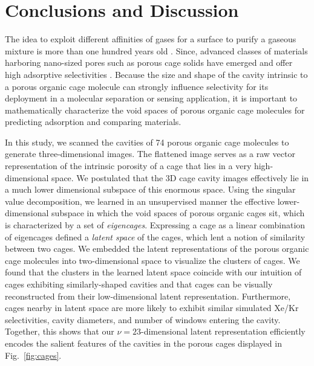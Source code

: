 \documentclass[journal=jacsat,manuscript=article,layout=traditional]{achemso}
\begin{document}
\section{Conclusions and Discussion}
The idea to exploit different affinities of gases for a surface to purify a gaseous mixture is more than one hundred years old \cite{boyle1908theabsorption}. Since, advanced classes of materials harboring nano-sized pores such as porous cage solids \cite{hasell2016porous,holst2010porous} have emerged and offer high adsorptive selectivities \cite{mastalerz2011salicylbisimine,tian2009amorphous,
hong2015porphyrin,chen2014separation,patil2016noria,sf6seps}.
Because the size and shape of the cavity intrinsic to a porous organic cage molecule can strongly influence selectivity for its deployment in a molecular separation or sensing application\cite{mitra2013molecular}, it is important to mathematically characterize the void spaces of porous organic cage molecules for predicting adsorption and comparing materials. 

In this study, we scanned the cavities of 74 porous organic cage molecules to generate three-dimensional images. The flattened image serves as a raw vector representation of the intrinsic porosity of a cage that lies in a very high-dimensional space. We postulated that the 3D cage cavity images effectively lie in a much lower dimensional subspace of this enormous space. Using the singular value decomposition, we learned in an unsupervised manner the effective lower-dimensional subspace in which the void spaces of porous organic cages sit, which is characterized by a set of \emph{eigencages}. Expressing a cage as a linear combination of eigencages defined a \emph{latent space} of the cages, which lent a notion of similarity between two cages. We embedded the latent representations of the porous organic cage molecules into two-dimensional space to visualize the clusters of cages. We found that the clusters in the learned latent space coincide with our intuition of cages exhibiting similarly-shaped cavities and that cages can be visually reconstructed from their low-dimensional latent representation. Furthermore, cages nearby in latent space are more likely to exhibit similar simulated Xe/Kr selectivities, cavity diameters, and number of windows entering the cavity. Together, this shows that our $\nu=23$-dimensional latent representation efficiently encodes the salient features of the cavities in the porous cages displayed in Fig.~\ref{fig:cages}.
\end{document}
